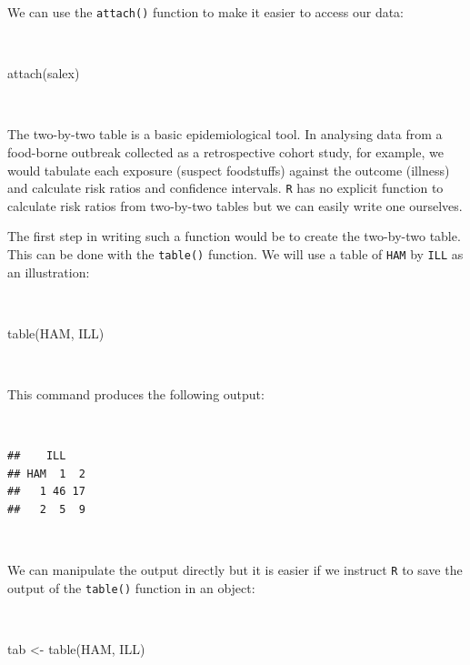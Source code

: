 \documentclass[
  12pt,
]{book}
\newenvironment{Shaded}{\begin{snugshade}}{\end{snugshade}}
\newcommand{\FunctionTok}[1]{\textcolor[rgb]{0.00,0.00,0.00}{#1}}
\newcommand{\NormalTok}[1]{#1}
\newcommand{\OtherTok}[1]{\textcolor[rgb]{0.56,0.35,0.01}{#1}}
\begin{document}
\newpage

We can use the \texttt{attach()} function to make it easier to access our data:

~

\begin{Shaded}
\begin{Highlighting}[]
\FunctionTok{attach}\NormalTok{(salex)}
\end{Highlighting}
\end{Shaded}

~

The two-by-two table is a basic epidemiological tool. In analysing data from a food-borne outbreak collected as a retrospective cohort study, for example, we would tabulate each exposure (suspect foodstuffs) against the outcome (illness) and calculate risk ratios and confidence intervals. \texttt{R} has no explicit function to calculate risk ratios from two-by-two tables but we can easily write one ourselves.

The first step in writing such a function would be to create the two-by-two table. This can be done with the \texttt{table()} function. We will use a table of \texttt{HAM} by \texttt{ILL} as an illustration:

~

\begin{Shaded}
\begin{Highlighting}[]
\FunctionTok{table}\NormalTok{(HAM, ILL)}
\end{Highlighting}
\end{Shaded}

~

This command produces the following output:

~

\begin{verbatim}
##    ILL
## HAM  1  2
##   1 46 17
##   2  5  9
\end{verbatim}

~

We can manipulate the output directly but it is easier if we instruct \texttt{R} to save the output of the \texttt{table()} function in an object:

~

\begin{Shaded}
\begin{Highlighting}[]
\NormalTok{tab }\OtherTok{\textless{}{-}} \FunctionTok{table}\NormalTok{(HAM, ILL)}
\end{Highlighting}
\end{Shaded}
\end{document}
